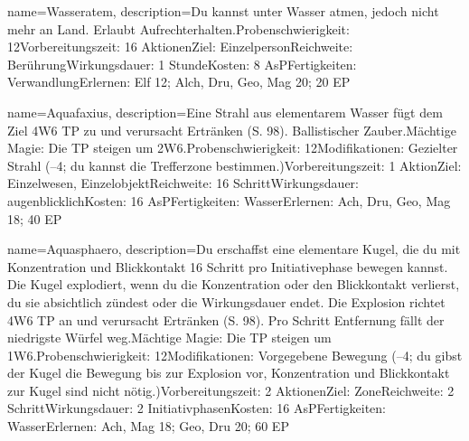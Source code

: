 {
    name={Wasseratem},
    description={Du kannst unter Wasser atmen, jedoch nicht mehr an Land. Erlaubt Aufrechterhalten.\newline Probenschwierigkeit: 12\newline Vorbereitungszeit: 16 Aktionen\newline Ziel: Einzelperson\newline Reichweite: Berührung\newline Wirkungsdauer: 1 Stunde\newline Kosten: 8 AsP\newline Fertigkeiten: Verwandlung\newline Erlernen: Elf 12; Alch, Dru, Geo, Mag 20; 20 EP}
}


{
    name={Aquafaxius},
    description={Eine Strahl aus elementarem Wasser fügt dem Ziel 4W6 TP zu und verursacht Ertränken (S. 98). Ballistischer Zauber.\newline Mächtige Magie: Die TP steigen um 2W6.\newline Probenschwierigkeit: 12\newline Modifikationen: Gezielter Strahl (–4; du kannst die Trefferzone bestimmen.)\newline Vorbereitungszeit: 1 Aktion\newline Ziel: Einzelwesen, Einzelobjekt\newline Reichweite: 16 Schritt\newline Wirkungsdauer: augenblicklich\newline Kosten: 16 AsP\newline Fertigkeiten: Wasser\newline Erlernen: Ach, Dru, Geo, Mag 18; 40 EP}
}


{
    name={Aquasphaero},
    description={Du erschaffst eine elementare Kugel, die du mit Konzentration und Blickkontakt 16 Schritt pro Initiativephase bewegen kannst. Die Kugel explodiert, wenn du die Konzentration oder den Blickkontakt verlierst, du sie absichtlich zündest oder die Wirkungsdauer endet. Die Explosion richtet 4W6 TP an und verursacht Ertränken (S. 98). Pro Schritt Entfernung fällt der niedrigste Würfel weg.\newline Mächtige Magie: Die TP steigen um 1W6.\newline Probenschwierigkeit: 12\newline Modifikationen: Vorgegebene Bewegung (–4; du gibst der Kugel die Bewegung bis zur Explosion vor, Konzentration und Blickkontakt zur Kugel sind nicht nötig.)\newline Vorbereitungszeit: 2 Aktionen\newline Ziel: Zone\newline Reichweite: 2 Schritt\newline Wirkungsdauer: 2 Initiativphasen\newline Kosten: 16 AsP\newline Fertigkeiten: Wasser\newline Erlernen: Ach, Mag 18; Geo, Dru 20; 60 EP}
}


